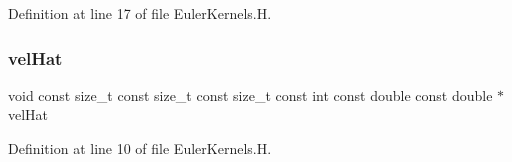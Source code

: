 Definition at line 17 of file Euler\+Kernels.\+H.

\hypertarget{EulerKernels_8H_af5e2f538d36775c7fb6d1dea9380ecde}{}\label{EulerKernels_8H_af5e2f538d36775c7fb6d1dea9380ecde} 
\subsubsection{\texorpdfstring{vel\+Hat}{velHat}}
{\footnotesize\ttfamily void const size\+\_\+t const size\+\_\+t const size\+\_\+t const int const double const double $\ast$ vel\+Hat}



Definition at line 10 of file Euler\+Kernels.\+H.

